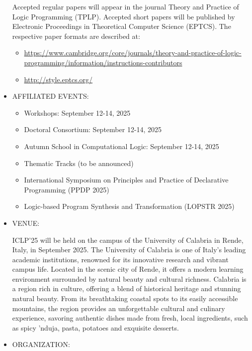 \documentclass[prodmode,acmtecs]{acmsmall} %
\begin{document}
\begin{itemize}
  Accepted regular papers will appear in the journal Theory and Practice of Logic Programming (TPLP). Accepted short papers will be published by Electronic Proceedings in Theoretical Computer Science (EPTCS). The respective paper formats are described at: 
 
\begin{itemize}\item  \href{https://www.cambridge.org/core/journals/theory-and-practice-of-logic-programming/information/instructions-contributors}{https://www.cambridge.org/core/journals/theory-and-practice-of-logic-programming/information/instructions-contributors}
\item  \href{http://style.eptcs.org/}{http://style.eptcs.org/}
\end{itemize} 
\item  AFFILIATED EVENTS: 
 
\begin{itemize}\item  Workshops: September 12-14, 2025
\item  Doctoral Consortium: September 12-14, 2025
\item  Autumn School in Computational Logic: September 12-14, 2025
\item  Thematic Tracks (to be announced)
\item  International Symposium on Principles and Practice of Declarative Programming (PPDP 2025)
\item  Logic-based Program Synthesis and Transformation (LOPSTR 2025)
\end{itemize} 
\item  VENUE: 
 
  ICLP’25 will be held on the campus of the University of Calabria in Rende, Italy, in September 2025. The University of Calabria is one of Italy's leading academic institutions, renowned for its innovative research and vibrant campus life. Located in the scenic city of Rende, it offers a modern learning environment surrounded by natural beauty and cultural richness. Calabria is a region rich in culture, offering a blend of historical heritage and stunning natural beauty. From its breathtaking coastal spots to its easily accessible mountains, the region provides an unforgettable cultural and culinary experience, savoring authentic dishes made from fresh, local ingredients, such as spicy 'nduja, pasta, potatoes and exquisite desserts. 
 
\item  ORGANIZATION: 
 

\end{itemize}
\end{document}
